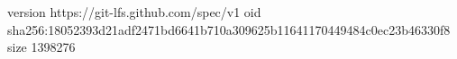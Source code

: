 version https://git-lfs.github.com/spec/v1
oid sha256:18052393d21adf2471bd6641b710a309625b11641170449484c0ec23b46330f8
size 1398276
